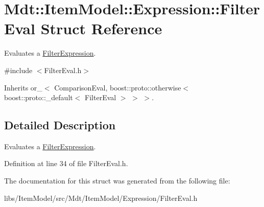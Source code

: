 \hypertarget{struct_mdt_1_1_item_model_1_1_expression_1_1_filter_eval}{}\section{Mdt\+:\+:Item\+Model\+:\+:Expression\+:\+:Filter\+Eval Struct Reference}
\label{struct_mdt_1_1_item_model_1_1_expression_1_1_filter_eval}


Evaluates a \hyperlink{class_mdt_1_1_item_model_1_1_filter_expression}{Filter\+Expression}.  




{\ttfamily \#include $<$Filter\+Eval.\+h$>$}



Inherits or\+\_\+$<$ Comparison\+Eval, boost\+::proto\+::otherwise$<$ boost\+::proto\+::\+\_\+default$<$ Filter\+Eval $>$ $>$ $>$.



\subsection{Detailed Description}
Evaluates a \hyperlink{class_mdt_1_1_item_model_1_1_filter_expression}{Filter\+Expression}. 

Definition at line 34 of file Filter\+Eval.\+h.



The documentation for this struct was generated from the following file\+:\begin{DoxyCompactItemize}
\item 
libs/\+Item\+Model/src/\+Mdt/\+Item\+Model/\+Expression/Filter\+Eval.\+h\end{DoxyCompactItemize}

